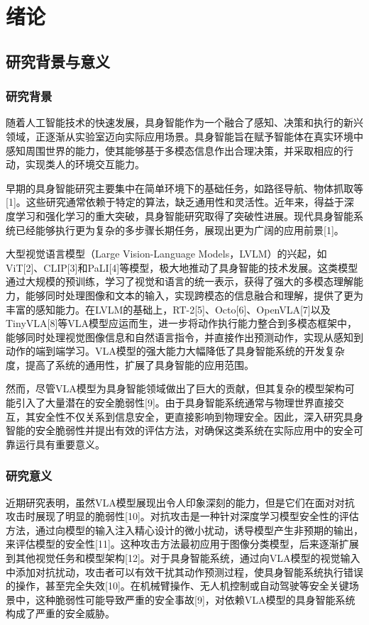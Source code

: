 \section{绪论}
\subsection{研究背景与意义}
\subsubsection{研究背景}

随着人工智能技术的快速发展，具身智能作为一个融合了感知、决策和执行的新兴领域，正逐渐从实验室迈向实际应用场景。具身智能旨在赋予智能体在真实环境中感知周围世界的能力，使其能够基于多模态信息作出合理决策，并采取相应的行动，实现类人的环境交互能力。

早期的具身智能研究主要集中在简单环境下的基础任务，如路径导航、物体抓取等[1]。这些研究通常依赖于特定的算法，缺乏通用性和灵活性。近年来，得益于深度学习和强化学习的重大突破，具身智能研究取得了突破性进展。现代具身智能系统已经能够执行更为复杂的多步骤长期任务，展现出更为广阔的应用前景[1]。

大型视觉语言模型（Large Vision-Language Models，LVLM）的兴起，如ViT[2]、CLIP[3]和PaLI[4]等模型，极大地推动了具身智能的技术发展。这类模型通过大规模的预训练，学习了视觉和语言的统一表示，获得了强大的多模态理解能力，能够同时处理图像和文本的输入，实现跨模态的信息融合和理解，提供了更为丰富的感知能力。在LVLM的基础上，RT-2[5]、Octo[6]、OpenVLA[7]以及TinyVLA[8]等VLA模型应运而生，进一步将动作执行能力整合到多模态框架中，能够同时处理视觉图像信息和自然语言指令，并直接作出预测动作，实现从感知到动作的端到端学习。VLA模型的强大能力大幅降低了具身智能系统的开发复杂度，提高了系统的通用性，扩展了具身智能的应用范围。

然而，尽管VLA模型为具身智能领域做出了巨大的贡献，但其复杂的模型架构可能引入了大量潜在的安全脆弱性[9]。由于具身智能系统通常与物理世界直接交互，其安全性不仅关系到信息安全，更直接影响到物理安全。因此，深入研究具身智能的安全脆弱性并提出有效的评估方法，对确保这类系统在实际应用中的安全可靠运行具有重要意义。

\subsubsection{研究意义}

近期研究表明，虽然VLA模型展现出令人印象深刻的能力，但是它们在面对对抗攻击时展现了明显的脆弱性[10]。对抗攻击是一种针对深度学习模型安全性的评估方法，通过向模型的输入注入精心设计的微小扰动，诱导模型产生非预期的输出，来评估模型的安全性[11]。这种攻击方法最初应用于图像分类模型，后来逐渐扩展到其他视觉任务和模型架构[12]。对于具身智能系统，通过向VLA模型的视觉输入中添加对抗扰动，攻击者可以有效干扰其动作预测过程，使具身智能系统执行错误的操作，甚至完全失效[10]。在机械臂操作、无人机控制或自动驾驶等安全关键场景中，这种脆弱性可能导致严重的安全事故[9]，对依赖VLA模型的具身智能系统构成了严重的安全威胁。

